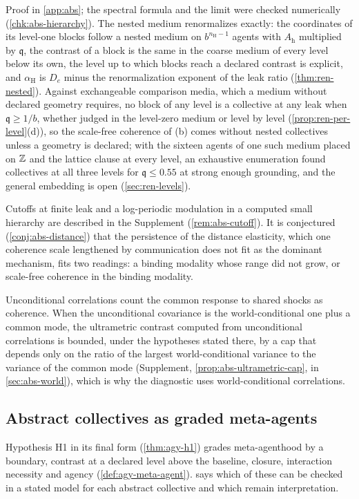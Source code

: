Proof in \cref{app:abs}; the spectral formula and the limit were checked numerically (\cref{chk:abs-hierarchy}). The nested medium renormalizes exactly: the coordinates of its level-one blocks follow a nested medium on $b^{n_{\mathrm H}-1}$ agents with $A_{\mathrm h}$ multiplied by $\mathfrak q$, the contrast of a block is the same in the coarse medium of every level below its own, the level up to which blocks reach a declared contrast is explicit, and $\alpha_{\mathrm H}$ is $D_e$ minus the renormalization exponent of the leak ratio (\cref{thm:ren-nested}). Against exchangeable comparison media, which a medium without declared geometry requires, no block of any level is a collective at any leak when $\mathfrak q\ge1/b$, whether judged in the level-zero medium or level by level (\cref{prop:ren-per-level}(d)), so the scale-free coherence of (b) comes without nested collectives unless a geometry is declared; with the sixteen agents of one such medium placed on $\mathbb{Z}$ and the lattice clause at every level, an exhaustive enumeration found collectives at all three levels for $\mathfrak q\le0.55$ at strong enough grounding, and the general embedding is open (\cref{sec:ren-levels}).

Cutoffs at finite leak and a log-periodic modulation in a computed small hierarchy are described in the Supplement (\cref{rem:abs-cutoff}). It is conjectured (\cref{conj:abs-distance}) that the persistence of the distance elasticity, which one coherence scale lengthened by communication does not fit as the dominant mechanism, fits two readings: a binding modality whose range did not grow, or scale-free coherence in the binding modality.

Unconditional correlations count the common response to shared shocks as coherence. When the unconditional covariance is the world-conditional one plus a common mode, the ultrametric contrast computed from unconditional correlations is bounded, under the hypotheses stated there, by a cap that depends only on the ratio of the largest world-conditional variance to the variance of the common mode (Supplement, \cref{prop:abs-ultrametric-cap}, in \cref{sec:abs-world}), which is why the diagnostic uses world-conditional correlations.

\subsection{Abstract collectives as graded meta-agents}\label{sec:abs-graded}

Hypothesis H1 in its final form (\cref{thm:agy-h1}) grades meta-agenthood by a boundary, contrast at a declared level above the baseline, closure, interaction necessity and agency (\cref{def:agy-meta-agent}).  says which of these can be checked in a stated model for each abstract collective and which remain interpretation.

